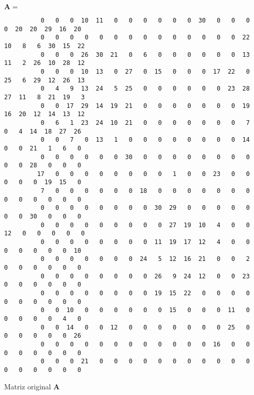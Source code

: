 \begin{listado}
$\mathbf{A} = $
\tiny
\begin{verbatim}
          0   0   0  10  11   0   0   0   0   0   0  30   0   0   0   0  20  20  29  16  20
          0   0   0   0   0   0   0   0   0   0   0   0   0   0  22  10   8   6  30  15  22
          0   0   0  26  30  21   0   6   0   0   0   0   0   0  13  11   2  26  10  28  12
          0   0   0  10  13   0  27   0  15   0   0   0  17  22   0  25   6  29  12  26  13
          0   4   9  13  24   5  25   0   0   0   0   0   0  23  28  27  11   8  21  19   3
          0   0  17  29  14  19  21   0   0   0   0   0   0   0  19  16  20  12  14  13  12
          0   6   1  23  24  10  21   0   0   0   0   0   0   0   7   0   4  14  18  27  26
          0   0   7   0  13   1   0   0   0   0   0   0   0   0  14   0   0  21   1   6   0
          0   0   0   0   0   0  30   0   0   0   0   0   0   0   0   0   0  28   0   0   0
         17   0   0   0   0   0   0   0   0   1   0   0  23   0   0   0   0   0  19  15   0
          7   0   0   0   0   0   0  18   0   0   0   0   0   0   0   0   0   0   0   0   0
          0   0   0   0   0   0   0   0  30  29   0   0   0   0   0   0   0  30   0   0   0
          0   0   0   0   0   0   0   0   0  27  19  10   4   0   0  12   0   0   0   0   0
          0   0   0   0   0   0   0   0  11  19  17  12   4   0   0   0   0   0   0   0  10
          0   0   0   0   0   0   0  24   5  12  16  21   0   0   2   0   0   0   0   0   0
          0   0   0   0   0   0   0   0  26   9  24  12   0   0  23   0   0   0   0   0   0
          0   0   0   0   0   0   0   0  19  15  22   0   0   0   0   0   0   0   0   0   0
          0   0  10   0   0   0   0   0   0  15   0   0   0  11   0   0   0   0   0   4   0
          0   0  14   0   0  12   0   0   0   0   0   0   0  25   0   0   0   0   0   0  26
          0   0   0   0   0   0   0   0   0   0   0   0  16   0   0   0   0   0   0   0   0
          0   0   0  21   0   0   0   0   0   0   0   0   0   0   0   0   0   0   0   0   0            
\end{verbatim}                                                                                 
\caption{Matriz original $\mathbf{A}$}                                                      
\label{lis:arraya}                                                                             
\end{listado}                                                                                  
                                                                                               
